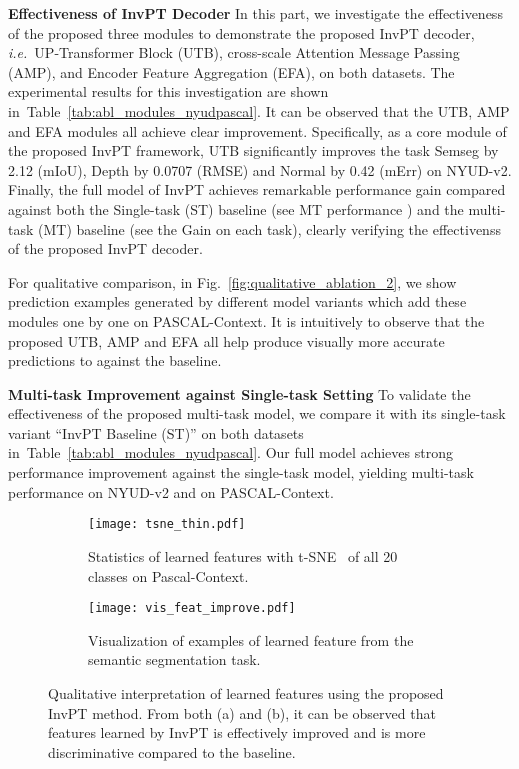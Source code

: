 \documentclass[runningheads]{llncs}
\newcommand*{\ie}{\emph{i.e.}}
\begin{document}
\par\noindent\textbf{Effectiveness of InvPT Decoder}
In this part, we investigate the effectiveness of the proposed three modules to demonstrate the proposed InvPT decoder, \ie~UP-Transformer Block (UTB), cross-scale Attention Message Passing (AMP), and Encoder Feature Aggregation (EFA), on both datasets. The experimental results for this investigation are shown in~Table~\ref{tab:abl_modules_nyudpascal}. It can be observed that the UTB, AMP and EFA modules all achieve clear improvement. Specifically, as a core module of the proposed InvPT framework, UTB significantly improves the task Semseg by 2.12 (mIoU), Depth by 0.0707 (RMSE) and Normal by 0.42 (mErr) on NYUD-v2.
Finally, the full model of InvPT achieves remarkable performance gain compared against both the Single-task (ST) baseline (see MT performance ) and the multi-task (MT) baseline (see the Gain on each task), clearly verifying the effectivenss of the proposed InvPT decoder.
\par For qualitative comparison, in Fig.~\ref{fig:qualitative_ablation_2}, we show prediction examples generated by different model variants which add these modules one by one on PASCAL-Context. It is intuitively to observe that the proposed UTB, AMP and EFA all help produce visually more accurate predictions to against the baseline.

\vspace{3pt}
\par\noindent\textbf{Multi-task Improvement against Single-task Setting}
To validate the effectiveness of the proposed multi-task model, we compare it with its single-task variant ``InvPT Baseline (ST)'' on both datasets in~Table~\ref{tab:abl_modules_nyudpascal}.
Our full model achieves strong performance improvement against the single-task model, yielding  multi-task performance on NYUD-v2 and  on PASCAL-Context.


\begin{figure}[t]
\centering
\vspace{-5pt}
\begin{subfigure}[t]{\textwidth}
    \centering
    \texttt{[image: tsne\_thin.pdf]}
    \caption{Statistics of learned features with t-SNE~\cite{van2008visualizing} of all 20 classes on Pascal-Context.}
    \label{fig:tsne}
\end{subfigure}

\begin{subfigure}[t]{\textwidth}
    \centering
    \texttt{[image: vis\_feat\_improve.pdf]}
    \caption{Visualization of examples of learned feature from the semantic segmentation task.}
    \label{fig:featimprove}
\vspace{-8pt}
\end{subfigure}
\caption{Qualitative interpretation of learned features using the proposed InvPT method. From both (a) and (b), it can be observed that features learned by InvPT is effectively improved and is more discriminative compared to the baseline.}
\label{fig:tsne_featimprove}
\vspace{-18pt}
\end{figure}
\end{document}
